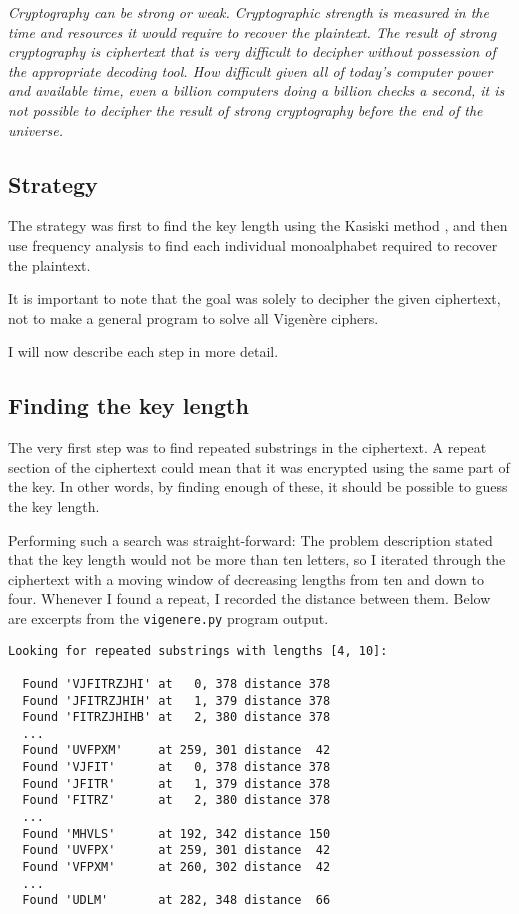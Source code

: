 \documentclass[a4paper,english,12pt]{article}
\begin{document}
\textit{Cryptography can be strong or weak. Cryptographic strength is measured
in the time and resources it would require to recover the plaintext.  The
result of strong cryptography is ciphertext that is very difficult to decipher
without possession of the appropriate decoding tool. How difficult given all of
today's computer power and available time, even a billion computers doing a
billion checks a second, it is not possible to decipher the result of strong
cryptography before the end of the universe.}

\subsection{Strategy}

The strategy was first to find the key length using the Kasiski method
\cite{dalkilic2000interactive, wiki:kasiski.examination}, and then use
frequency analysis to find each individual monoalphabet required to recover
the plaintext.

It is important to note that the goal was solely to decipher the given
ciphertext, not to make a general program to solve all Vigenère ciphers.

I will now describe each step in more detail.

\subsection{Finding the key length}

The very first step was to find repeated substrings in the ciphertext. A repeat
section of the ciphertext could mean that it was encrypted using the same part
of the key. In other words, by finding enough of these, it should be possible
to guess the key length.

Performing such a search was straight-forward: The problem description stated
that the key length would not be more than ten letters, so I iterated through
the ciphertext with a moving window of decreasing lengths from ten and down to
four.  Whenever I found a repeat, I recorded the distance between them. Below
are excerpts from the \texttt{vigenere.py} program output.

\begin{verbatim}
Looking for repeated substrings with lengths [4, 10]:

  Found 'VJFITRZJHI' at   0, 378 distance 378
  Found 'JFITRZJHIH' at   1, 379 distance 378
  Found 'FITRZJHIHB' at   2, 380 distance 378
  ...
  Found 'UVFPXM'     at 259, 301 distance  42
  Found 'VJFIT'      at   0, 378 distance 378
  Found 'JFITR'      at   1, 379 distance 378
  Found 'FITRZ'      at   2, 380 distance 378
  ...
  Found 'MHVLS'      at 192, 342 distance 150
  Found 'UVFPX'      at 259, 301 distance  42
  Found 'VFPXM'      at 260, 302 distance  42
  ...
  Found 'UDLM'       at 282, 348 distance  66
\end{verbatim}
\end{document}
